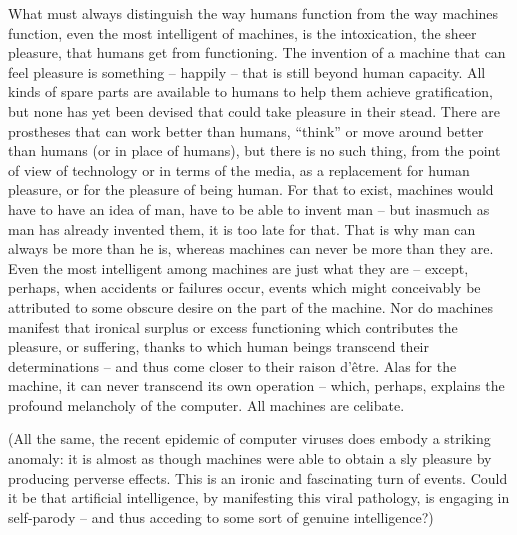 \documentclass[10pt,twoside,openright]{memoir}
\begin{document}
What must always distinguish the way humans function from the way machines function, even the most intelligent of machines, is the intoxication, the sheer pleasure, that humans get from functioning. The invention of a machine that can feel pleasure is something -- happily -- that is still beyond human capacity. All kinds of spare parts are available to humans to help them achieve gratification, but none has yet been devised that could take pleasure in their stead. There are prostheses that can work better than humans, ``think'' or move around better than humans (or in place of humans), but there is no such thing, from the point of view of technology or in terms of the media, as a replacement for human pleasure, or for the pleasure of being human. For that to exist, machines would have to have an idea of man, have to be able to invent man -- but inasmuch as man has already invented them, it is too late for that. That is why man can always be more than he is, whereas machines can never be more than they are. Even the most intelligent among machines are just what they are -- except, perhaps, when accidents or failures occur, events which might conceivably be attributed to some obscure desire on the part of the machine. Nor do machines manifest that ironical surplus or excess functioning which contributes the pleasure, or suffering, thanks to which human beings transcend their determinations -- and thus come closer to their raison d'\^etre. Alas for the machine, it can never transcend its own operation -- which, perhaps, explains the profound melancholy of the computer. All machines are celibate. 

(All the same, the recent epidemic of computer viruses does embody a striking anomaly: it is almost as though machines were able to obtain a sly pleasure by producing perverse effects. This is an ironic and fascinating turn of events. Could it be that artificial intelligence, by manifesting this viral pathology, is engaging in self-parody -- and thus acceding to some sort of genuine intelligence?)
\end{document}
